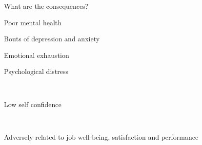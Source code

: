 \documentclass[aspectratio=169]{beamer}
\begin{document}
\begin{frame}
  \begin{center}
    \Huge What are the consequences?
  \end{center}
\end{frame}

\begin{frame}
  \begin{center}
    \Huge Poor mental health
    \\ \small \cite{sakulku11}
  \end{center}
\end{frame}

\begin{frame}
  \begin{center}
    \Huge Bouts of depression and anxiety
    \\ \small \cite{hh15}
  \end{center}
\end{frame}

\begin{frame}
  \begin{center}
    \Huge Emotional exhaustion
    \\ \small \cite{hh15}
  \end{center}
\end{frame}


\begin{frame}
  \begin{center}
    \Huge Psychological distress

    \\ \small \cite{hh15}
  \end{center}
\end{frame}

\begin{frame}
  \begin{center}
    \Huge Low self confidence

    \\ \small \cite{hh15}
  \end{center}
\end{frame}

\begin{frame}
  \begin{center}
    \Huge Adversely related to job well-being, satisfaction and performance
    \\ \small \cite{hh15}
  \end{center}
\end{frame}
\end{document}

